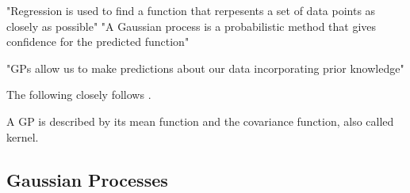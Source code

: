 \documentclass[%
  a4paper,oneside,%
  11pt,%
  smallchapters,
  style=printdev,
  extramargin,
  green,%
  rgb, <cmyk>
  ]{tubsbook}
\begin{document}
"Regression is used to find a function that rerpesents a set of data points as closely as possible" \cite{gortler2019}
\cite{gortler2019} "A Gaussian process is a probabilistic method that gives confidence for the predicted function"

"GPs allow us to make predictions about our data incorporating prior knowledge"



The following closely follows \cite{rasmussen2006}.




A GP is described by its mean function and the covariance function, also called kernel.






\subsection{Gaussian Processes}
\end{document}
